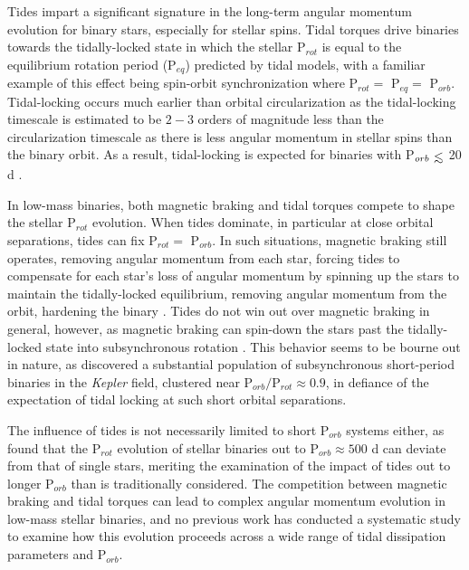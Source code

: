 \documentclass[twocolumn]{aastex61}
\def\lsim{~\rlap{$<$}{\lower 1.0ex\hbox{$\sim$}}}
\newcommand{\kepler}[0]{\textit{Kepler}\xspace}
\begin{document}
Tides impart a significant signature in the long-term angular momentum evolution for binary stars, especially for stellar spins. Tidal torques drive binaries towards the tidally-locked state in which the stellar P$_{rot}$ is equal to the equilibrium rotation period (P$_{eq}$) predicted by tidal models, with a familiar example of this effect being spin-orbit synchronization where P$_{rot} = $ P$_{eq} = $ P$_{orb}$.  Tidal-locking occurs much earlier than orbital circularization as the tidal-locking timescale is estimated to be $2-3$ orders of magnitude less than the circularization timescale \citep{Zahn1989,Witte2002,Mazeh2008} as there is less angular momentum in stellar spins than the binary orbit. As a result, tidal-locking is expected for binaries with P$_{orb} \lsim$ 20 d \citep[e.g.][]{Levato1974,Meibom2006,Mazeh2008,Zahn2008,Meibom2015}.

In low-mass binaries, both magnetic braking and tidal torques compete to shape the stellar P$_{rot}$ evolution. When tides dominate, in particular at close orbital separations, tides can fix P$_{rot} =$ P$_{orb}$. In such situations, magnetic braking still operates, removing angular momentum from each star, forcing tides to compensate for each star's loss of angular momentum by spinning up the stars to maintain the tidally-locked equilibrium, removing angular momentum from the orbit, hardening the binary \citep[][]{Verbunt1981,Repetto2014,Fleming2017}. Tides do not win out over magnetic braking in general, however, as magnetic braking can spin-down the stars past the tidally-locked state into subsynchronous rotation \citep[e.g. P$_{rot} >$ P$_{orb}$, ][]{Habets1989,Zahn1994,Keppens1997}. This behavior seems to be bourne out in nature, as \citet{Lurie2017} discovered a substantial population of subsynchronous short-period binaries in the \kepler field, clustered near P$_{orb}/$P$_{rot}{\approx} 0.9$, in defiance of the expectation of tidal locking at such short orbital separations. 

The influence of tides is not necessarily limited to short P$_{orb}$ systems either, as \citet{Abt2004} found that the P$_{rot}$ evolution of stellar binaries out to P$_{orb} \approx 500$ d can deviate from that of single stars, meriting the examination of the impact of tides out to longer P$_{orb}$ than is traditionally considered. The competition between magnetic braking and tidal torques can lead to complex angular momentum evolution in low-mass stellar binaries, and no previous work has conducted a systematic study to examine how this evolution proceeds across a wide range of tidal dissipation parameters and P$_{orb}$.
\end{document}
